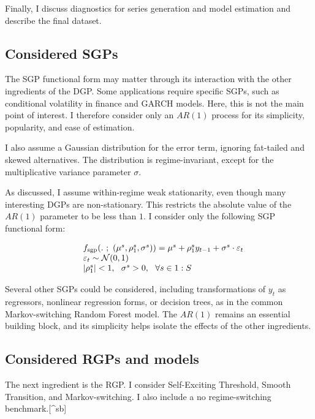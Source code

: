 \documentclass[
  letterpaper,
  DIV=11,
  numbers=noendperiod]{scrartcl}
\numberwithin{equation}{section}
\numberwithin{table}{section}
\numberwithin{figure}{section}
\begin{document}
Finally, I discuss diagnostics for series generation and model
estimation and describe the final dataset.

\subsection{Considered SGPs}\label{sec-impl-sgp}

The SGP functional form may matter through its interaction with the
other ingredients of the DGP. Some applications require specific SGPs,
such as conditional volatility in finance and GARCH models. Here, this
is not the main point of interest. I therefore consider only an
\(AR(1)\) process for its simplicity, popularity, and ease of
estimation.

I also assume a Gaussian distribution for the error term, ignoring
fat-tailed and skewed alternatives. The distribution is
regime-invariant, except for the multiplicative variance parameter
\(\sigma\).

As discussed, I assume within-regime weak stationarity, even though many
interesting DGPs are non-stationary. This restricts the absolute value
of the \(AR(1)\) parameter to be less than \(1\). I consider only the
following SGP functional form:

\begin{equation}
\begin{array}{ll}
    &f_{\text{sgp}}(. ~;~ (\mu^s, \rho^s_1, \sigma^s)) = \mu^s + \rho^s_1 y_{t-1} + \sigma^s \cdot \varepsilon_t\\
    &\varepsilon_t \sim \mathcal{N}(0, 1)\\
    &|\rho^s_1| < 1, ~~ \sigma^s > 0, ~~ \forall s \in 1:S
\end{array}
\end{equation}

Several other SGPs could be considered, including transformations of
\(y_t\) as regressors, nonlinear regression forms, or decision trees, as
in the common Markov-switching Random Forest model. The \(AR(1)\)
remains an essential building block, and its simplicity helps isolate
the effects of the other ingredients.

\subsection{Considered RGPs and models}\label{sec-impl-rgp}

The next ingredient is the RGP. I consider Self-Exciting Threshold,
Smooth Transition, and Markov-switching. I also include a no
regime-switching benchmark.{[}\^{}sb{]}
\end{document}
